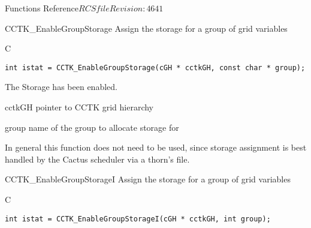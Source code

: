\begin{cactuspart}{ Functions Reference}{$RCSfile$}{$Revision: 4641 $}
\begin{FunctionDescription}{CCTK\_EnableGroupStorage}
\label{CCTK-EnableGroupStorage}
Assign the storage for a group of grid variables
\begin{SynopsisSection}
\begin{Synopsis}{C}
\begin{verbatim}
int istat = CCTK_EnableGroupStorage(cGH * cctkGH, const char * group);
\end{verbatim}
\end{Synopsis}
\end{SynopsisSection}

\begin{ResultSection}
\begin{Result}{0}
The Storage has been enabled.
\end{Result}
\end{ResultSection}

\begin{ParameterSection}
\begin{Parameter}{cctkGH}
pointer to CCTK grid hierarchy
\end{Parameter}
\begin{Parameter}{group}
name of the group to allocate storage for
\end{Parameter}
\end{ParameterSection}

\begin{Discussion}
In general this function does not need to be used, since storage assignment is best handled by
the Cactus scheduler via a thorn's  file.
\end{Discussion}

\end{FunctionDescription}

\begin{FunctionDescription}{CCTK\_EnableGroupStorageI}
\label{CCTK-EnableGroupStorageI}
Assign the storage for a group of grid variables
\begin{SynopsisSection}
\begin{Synopsis}{C}
\begin{verbatim}
int istat = CCTK_EnableGroupStorageI(cGH * cctkGH, int group);
\end{verbatim}
\end{Synopsis}
\end{SynopsisSection}


\end{FunctionDescription}
\end{cactuspart}

